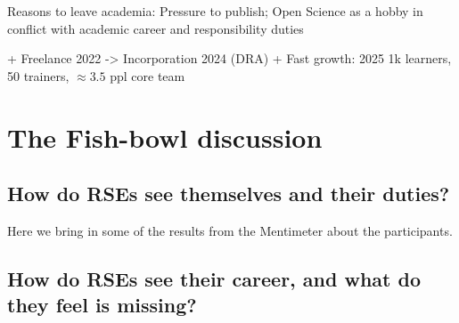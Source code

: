 \documentclass{eceasst}
\begin{document}
   Reasons to leave academia: Pressure to publish; Open Science as a hobby in conflict with academic career and responsibility duties

   + Freelance 2022 -> Incorporation 2024 (DRA)
   + Fast growth: 2025 1k learners, 50 trainers, $\approx 3.5$ ppl core team


\section{The Fish-bowl discussion}

\subsection{How do RSEs see themselves and their duties?}
Here we bring in some of the results from the Mentimeter about the participants.





\subsection{How do RSEs see their career, and what do they feel is missing?}

\end{document}
